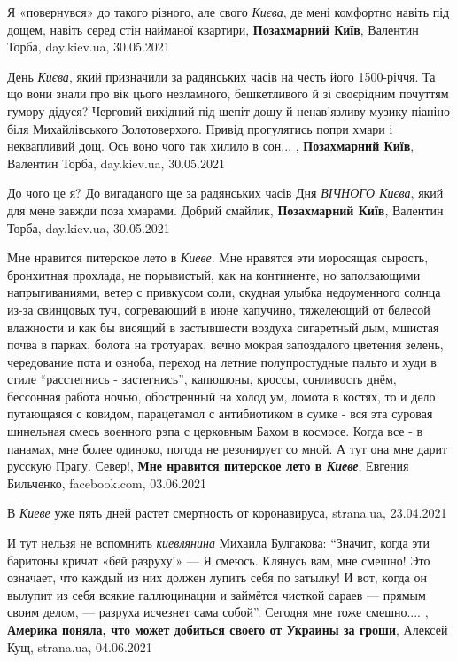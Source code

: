 Я «повернувся» до такого різного, але свого \emph{Києва}, де мені комфортно навіть під
дощем, навіть серед стін найманої квартири,
\textbf{Позахмарний Київ}, Валентин Торба, day.kiev.ua, 30.05.2021

День \emph{Києва}, який призначили за радянських часів на честь його
1500-річчя. Та що вони знали про вік цього незламного, бешкетливого й зі
своєрідним почуттям гумору дідуся? Черговий вихідний під шепіт дощу й
ненав'язливу музику піаніно біля Михайлівського Золотоверхого. Привід
прогулятись попри хмари і неквапливий дощ. Ось воно чого так хилило в сон... ,
\textbf{Позахмарний Київ}, Валентин Торба, day.kiev.ua, 30.05.2021

До чого це я? До вигаданого ще за радянських часів Дня \emph{ВІЧНОГО Києва},
який для мене завжди поза хмарами. Добрий смайлик,
\textbf{Позахмарний Київ}, Валентин Торба, day.kiev.ua, 30.05.2021

Мне нравится питерское лето в \emph{Киеве}. Мне нравятся эти моросящая сырость,
бронхитная прохлада, не порывистый, как на континенте, но заползающими
напрыгиваниями, ветер с привкусом соли, скудная улыбка недоуменного солнца
из-за свинцовых туч, согревающий в июне капучино, тяжелеющий от белесой
влажности и как бы висящий в застывшести воздуха сигаретный дым, мшистая почва
в парках, болота на тротуарах, вечно мокрая запоздалого цветения зелень,
чередование пота и озноба, переход на летние полупростудные пальто и худи в
стиле \enquote{расстегнись - застегнись}, капюшоны, кроссы, сонливость днём,
бессонная работа ночью, обостренный на холод ум, ломота в костях, то и дело
путающаяся с ковидом, парацетамол с антибиотиком в сумке - вся эта суровая
шинельная смесь военного рэпа с церковным Бахом в космосе. Когда все - в
панамах, мне более одиноко, погода не резонирует со мной. А тут она мне дарит
русскую Прагу. Север!,
\textbf{Мне нравится питерское лето в \emph{Киеве}}, Евгения Бильченко, facebook.com, 03.06.2021

В \emph{Киеве} уже пять дней растет смертность от коронавируса,
strana.ua, 23.04.2021

И тут нельзя не вспомнить \emph{киевлянина} Михаила Булгакова: \enquote{Значит, когда эти
баритоны кричат «бей разруху!» — Я смеюсь. Клянусь вам, мне смешно!  Это
означает, что каждый из них должен лупить себя по затылку!  И вот, когда он
вылупит из себя всякие галлюцинации и займётся чисткой сараев — прямым своим
делом, — разруха исчезнет сама собой}. Сегодня мне тоже смешно.... ,
\textbf{Америка поняла, что может добиться своего от Украины за гроши},
Алексей Кущ, strana.ua, 04.06.2021

